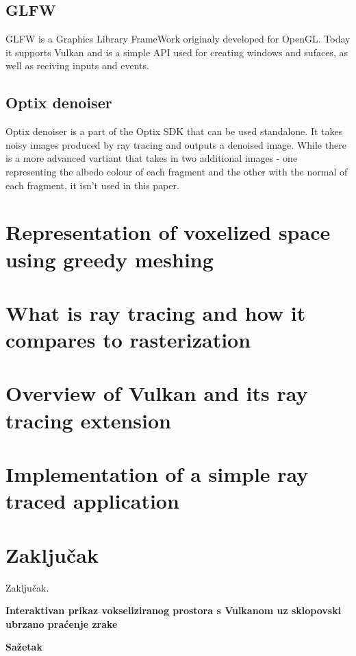 \documentclass[times, utf8, zavrsni]{fer}
\begin{document}
\section{GLFW}
GLFW is a Graphics Library FrameWork originaly developed for OpenGL. Today it supports Vulkan and is a simple API used for creating windows and sufaces, as well as reciving inputs and events.

\section{Optix denoiser}
Optix denoiser is a part of the Optix SDK that can be used standalone. It takes noisy images produced by ray tracing and outputs a denoised image. While there is a more advanced vartiant that takes in two additional images - one representing the albedo colour of each fragment and the other with the normal of each fragment, it isn't used in this paper.

\chapter{Representation of voxelized space using greedy meshing}
\chapter{What is ray tracing and how it compares to rasterization}
\chapter{Overview of Vulkan and its ray tracing extension}
\chapter{Implementation of a simple ray traced application}

\chapter{Zaključak}
Zaključak.




\newpage
\vspace*{\fill}
\thispagestyle{empty}
\begin{center}
  {\bf Interaktivan prikaz vokseliziranog prostora s Vulkanom uz sklopovski ubrzano praćenje zrake}
\end{center}
\hspace*{\fill} {\bf Sa\v{z}etak} \hspace*{\fill} \par
\vspace*{25pt}
\end{document}
